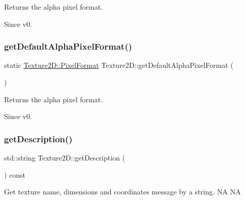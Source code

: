 Returns the alpha pixel format. \begin{DoxySince}{Since}
v0. 
\end{DoxySince}
\mbox{\label{classTexture2D_ae7e9ce2ec2a62fafe9e25c96f24a57bb}} 
\subsubsection{\texorpdfstring{get\+Default\+Alpha\+Pixel\+Format()}{getDefaultAlphaPixelFormat()}\hspace{0.1cm}{\footnotesize\ttfamily [2/2]}}
{\footnotesize\ttfamily static \hyperlink{classTexture2D_a45d9d8bb5a0669def36bbdfbfb91d220}{Texture2\+D\+::\+Pixel\+Format} Texture2\+D\+::get\+Default\+Alpha\+Pixel\+Format (\begin{DoxyParamCaption}{ }\end{DoxyParamCaption})\hspace{0.3cm}{\ttfamily [static]}}

Returns the alpha pixel format. \begin{DoxySince}{Since}
v0. 
\end{DoxySince}
\mbox{\label{classTexture2D_a3fd096dcfb192b188323c542edee64b5}} 
\subsubsection{\texorpdfstring{get\+Description()}{getDescription()}\hspace{0.1cm}{\footnotesize\ttfamily [1/2]}}
{\footnotesize\ttfamily std\+::string Texture2\+D\+::get\+Description (\begin{DoxyParamCaption}{ }\end{DoxyParamCaption}) const\hspace{0.3cm}{\ttfamily [virtual]}}

Get texture name, dimensions and coordinates message by a string.  NA  NA \mbox{\label{classTexture2D_aa2c1fc6c5eb4f22fff53abb9a03b1dea}} 

